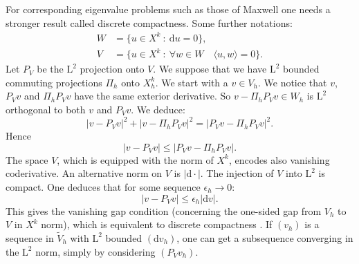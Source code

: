 \documentclass[10pt,a4paper]{article}
\newcommand{\rmd}{\mathrm{d}}
\newcommand{\rmL}{\mathrm{L}}
\theoremstyle{remark}
\theoremstyle{definition}
\numberwithin{equation}{section}
\begin{document}
For corresponding eigenvalue problems such as those of Maxwell \cite{Bof10,ChrWin13IMA} one needs a stronger result called discrete compactness. Some further notations:
\begin{align}
  W & = \{u \in X^k \ : \ \rmd u = 0\},\\
  V & = \{u \in X^k \ : \ \forall w \in W \quad \langle u, w \rangle = 0\}.
\end{align}
Let $P_V$ be the $\rmL^2$ projection onto $V$. We suppose that we have $\rmL^2$ bounded commuting projections $\Pi_h$ onto $X^k_h$. We start with a $v \in V_h$. We notice that $v$, $P_V v$ and $\Pi_h P_V v$ have the same exterior derivative. So $v - \Pi_h P_V v \in W_h$ is $\rmL^2$ orthogonal to both $v$ and $P_V v$. We deduce: 
\begin{equation}
  |v - P_V v|^2 + |v - \Pi_h P_V v |^2 = |P_V v - \Pi_h P_V v|^2.  
\end{equation}
Hence
\begin{equation}
  |v - P_V v| \leq  |P_V v - \Pi_h P_V v|.
\end{equation}
The space $V$, which is equipped with the norm of $X^k$, encodes also vanishing coderivative. An alternative norm on $V$ is $|\rmd \cdot |$. The injection of $V$ into $\rmL^2$ is compact. One deduces that for some sequence $\epsilon_h \to 0$:
\begin{equation}
  |v - P_V v| \leq \epsilon_h | \rmd v|.
\end{equation}
This gives the vanishing gap condition (concerning the one-sided gap from $V_h$ to $V$ in $X^k$ norm), which is equivalent to discrete compactness \cite[Proposition 3.9]{ChrWin13IMA}. If $(v_h)$ is a sequence in $\widetilde V_h$ with $\rmL^2$ bounded $(\rmd v_h)$, one can get a subsequence converging in the $\rmL^2$ norm, simply by considering $(P_V v_h)$.
\end{document}
